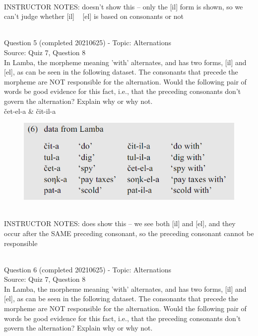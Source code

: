\documentclass[12pt]{article}
\begin{document}
~\\
INSTRUCTOR NOTES: doesn't show this -- only the [il] form is shown, so we can't judge whether [il] ~ [el] is based on consonants or not


~\\

{\large Question 5} (completed 20210625) - Topic: Alternations\\
Source: Quiz 7, Question 8\\

In Lamba, the morpheme meaning 'with' alternates, and has two forms, [il] and [el], as can be seen in the following dataset. The consonants that precede the morpheme are NOT responsible for the alternation. Would the following pair of words be good evidence for this fact, i.e., that the preceding consonants don't govern the alternation? Explain why or why not.\\

čet-el-a \& čit-il-a

\begin{figure}[H]
\includegraphics{../images/peng119_lamba.png}
\end{figure}

~\\
INSTRUCTOR NOTES: does show this -- we see both [il] and [el], and they occur after the SAME preceding consonant, so the preceding consonant cannot be responsible


~\\

{\large Question 6} (completed 20210625) - Topic: Alternations\\
Source: Quiz 7, Question 8\\

In Lamba, the morpheme meaning 'with' alternates, and has two forms, [il] and [el], as can be seen in the following dataset. The consonants that precede the morpheme are NOT responsible for the alternation. Would the following pair of words be good evidence for this fact, i.e., that the preceding consonants don't govern the alternation? Explain why or why not.\\
\end{document}
